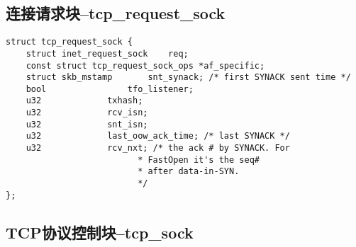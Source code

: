\documentclass[11pt, a4paper,oneside]{book}
\theoremstyle{ocrenumbox}
\theoremstyle{purplenumbox}
\theoremstyle{blackbox}
\begin{document}
		\subsection{连接请求块--tcp\_request\_sock}
\begin{verbatim}
struct tcp_request_sock {
	struct inet_request_sock 	req;
	const struct tcp_request_sock_ops *af_specific;
	struct skb_mstamp		snt_synack; /* first SYNACK sent time */
	bool				tfo_listener;
	u32				txhash;
	u32				rcv_isn;
	u32				snt_isn;
	u32				last_oow_ack_time; /* last SYNACK */
	u32				rcv_nxt; /* the ack # by SYNACK. For
						  * FastOpen it's the seq#
						  * after data-in-SYN.
						  */
};
\end{verbatim}
		\subsection{TCP协议控制块--tcp\_sock}
\end{document}
